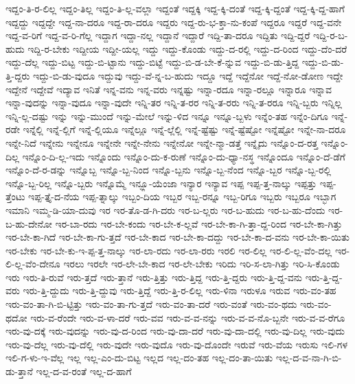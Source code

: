 {ಇದ್ದಂ-ತಿ-ರ-ಲಿಲ್ಲ
ಇದ್ದಂ-ತಿಲ್ಲ
ಇದ್ದಂ-ತಿ-ಲ್ಲ-ವಲ್ಲಾ
ಇದ್ದಂತೆ
ಇದ್ದಕ್ಕಿ
ಇದ್ದ-ಕ್ಕಿ-ದಂತೆ
ಇದ್ದ-ಕ್ಕಿ-ದ್ದಂತೆ
ಇದ್ದ-ಕ್ಕಿ-ದ್ದ-ಹಾಗೆ
ಇದ್ದದ್ದು
ಇದ್ದದ್ದೇ
ಇದ್ದ-ನಾ-ದರೂ
ಇದ್ದ-ರಾ-ದರೂ
ಇದ್ದರು
ಇದ್ದ-ರು-ಭ-ಕ್ತಾ-ನು-ಕಂಪೆ
ಇದ್ದರೂ
ಇದ್ದರೆ
ಇದ್ದ-ವನೇ
ಇದ್ದ-ವ-ರಿಗೆ
ಇದ್ದ-ವ-ರಿ-ಗೆಲ್ಲ
ಇದ್ದಾಗ
ಇದ್ದಾ-ನಲ್ಲ
ಇದ್ದಾನೆ
ಇದ್ದಾರೆ
ಇದ್ದಿ-ತಾ-ದರೂ
ಇದ್ದಿತು
ಇದ್ದಿ-ದ್ದರೆ
ಇದ್ದಿ-ರ-ಬ-ಹುದು
ಇದ್ದಿ-ರ-ಬೇಕು
ಇದ್ದೀಯ
ಇದ್ದೀ-ಯಲ್ಲ
ಇದ್ದು
ಇದ್ದು-ಕೊಂಡು
ಇದ್ದು-ದ-ರಲ್ಲಿ
ಇದ್ದು-ದ-ರಿಂದ
ಇದ್ದು-ದೆಂ-ದರೆ
ಇದ್ದು-ದೆಲ್ಲ
ಇದ್ದು-ಬಿಟ್ಟ
ಇದ್ದು-ಬಿ-ಟ್ಟಾನು
ಇದ್ದು-ಬಿಟ್ಟೆ
ಇದ್ದು-ಬಿ-ಡ-ಬೇ-ಕೆ-ನ್ನುವ
ಇದ್ದು-ಬಿ-ಡು-ತ್ತಿದ್ದ
ಇದ್ದು-ಬಿ-ಡು-ತ್ತಿ-ದ್ದರು
ಇದ್ದು-ಬಿ-ಡು-ವುದೂ
ಇದ್ದುವು
ಇದ್ದು-ವೆ-ನ್ನ-ಬ-ಹುದು
ಇದ್ದೂ
ಇದ್ದೆ
ಇದ್ದೆನೋ
ಇದ್ದೆ-ನೋ-ಡೋಣ
ಇದ್ದೇ
ಇದ್ದೇನೆ
ಇದ್ದೇವೆ
ಇದ್ಯಾವ
ಇನಿತೆ
ಇನ್ನ-ವನು
ಇನ್ನ-ವರು
ಇನ್ನಷ್ಟು
ಇನ್ನಾ-ರದೂ
ಇನ್ನಾ-ರಲ್ಲೂ
ಇನ್ನಾರೂ
ಇನ್ನಾವ
ಇನ್ನಾ-ವುದನ್ನು
ಇನ್ನಾ-ವುದೂ
ಇನ್ನಾ-ವುದೇ
ಇನ್ನಿ-ತರ
ಇನ್ನಿ-ತ-ರರ
ಇನ್ನಿ-ತ-ರರು
ಇನ್ನಿ-ತ-ರರೂ
ಇನ್ನಿ-ಬ್ಬರು
ಇನ್ನಿಲ್ಲ
ಇನ್ನಿ-ಲ್ಲ-ದಷ್ಟು
ಇನ್ನು
ಇನ್ನು-ಮುಂದೆ
ಇನ್ನು-ಮೇಲೆ
ಇನ್ನು-ಳಿದ
ಇನ್ನೂ
ಇನ್ನೂ-ಬ್ಬಳು
ಇನ್ನೆಂ-ತಹ
ಇನ್ನೆಂ-ದಿಗೂ
ಇನ್ನೆ-ರಡೇ
ಇನ್ನೆಲ್ಲಿ
ಇನ್ನೆ-ಲ್ಲಿಗೆ
ಇನ್ನೆ-ಲ್ಲಿಯೂ
ಇನ್ನೆಲ್ಲೂ
ಇನ್ನೆ-ಲ್ಲೆಲ್ಲಿ
ಇನ್ನೆ-ಷ್ಟೆಷ್ಟು
ಇನ್ನೆ-ಷ್ಟೆಷ್ಟೋ
ಇನ್ನೆಷ್ಟೋ
ಇನ್ನೇ-ನಾ-ದರೂ
ಇನ್ನೇ-ನಿದೆ
ಇನ್ನೇನು
ಇನ್ನೇನೂ
ಇನ್ನೇನೇ
ಇನ್ನೇ-ನೇನು
ಇನ್ನೇನೋ
ಇನ್ನೇ-ನ್ಮಾ-ಡತ್ತೆ
ಇನ್ನೈದು
ಇನ್ನೊಂ-ದ-ರತ್ತ
ಇನ್ನೊಂ-ದಿಲ್ಲ
ಇನ್ನೊಂ-ದಿ-ಲ್ಲ-ಇದು
ಇನ್ನೊಂದು
ಇನ್ನೊಂ-ದು-ಕ-ರುಣೆ
ಇನ್ನೊಂ-ದು-ಧ್ಯಾ-ನಸ್ಥ
ಇನ್ನೊಂದೂ
ಇನ್ನೊಂ-ದೆ-ಡೆಗೆ
ಇನ್ನೊಂ-ದೆ-ರ-ಡನ್ನು
ಇನ್ನೊಬ್ಬ
ಇನ್ನೊ-ಬ್ಬ-ನಿಂದ
ಇನ್ನೊ-ಬ್ಬನು
ಇನ್ನೊ-ಬ್ಬ-ನೆಂದ
ಇನ್ನೊ-ಬ್ಬರ
ಇನ್ನೊ-ಬ್ಬ-ರಲ್ಲಿ
ಇನ್ನೊ-ಬ್ಬ-ರಿಲ್ಲ
ಇನ್ನೊ-ಬ್ಬರು
ಇನ್ನೊಮ್ಮೆ
ಇನ್ಫ್ಲೂ-ಯೆಂಜಾ
ಇನ್ಯಾರ
ಇನ್ಯಾವ
ಇಪ್ಪ
ಇಪ್ಪ-ತ್ತ-ನಾಲ್ಕು
ಇಪ್ಪತ್ತು
ಇಪ್ಪ-ತ್ತೆಂಟು
ಇಪ್ಪ-ತ್ತೈ-ದ-ನೆಯ
ಇಪ್ಪ-ತ್ನಾಲ್ಕು
ಇಬ್ಬಂ-ದಿಯ
ಇಬ್ಬರ
ಇಬ್ಬ-ರನ್ನೂ
ಇಬ್ಬ-ರಿಗೂ
ಇಬ್ಬರು
ಇಬ್ಬರೂ
ಇಬ್ಭಾಗ
ಇಮಾನಿ
ಇಮ್ಮ-ಡಿ-ಯಾ-ದುವು
ಇರ
ಇರ-ತೊ-ಡ-ಗಿ-ದರು
ಇರ-ಬ-ಲ್ಲರು
ಇರ-ಬ-ಹುದು
ಇರ-ಬ-ಹು-ದೆಂದು
ಇರ-ಬ-ಹು-ದೇನೋ
ಇರ-ಬಾ-ರದು
ಇರ-ಬೇ-ಕಂದು
ಇರ-ಬೇ-ಕ-ಲ್ಲವೆ
ಇರ-ಬೇ-ಕಾ-ಗಿ-ತ್ತಾ-ದ್ದ-ರಿಂದ
ಇರ-ಬೇ-ಕಾ-ಗಿತ್ತು
ಇರ-ಬೇ-ಕಾ-ಗಿದೆ
ಇರ-ಬೇ-ಕಾ-ಗು-ತ್ತದೆ
ಇರ-ಬೇ-ಕಾದ
ಇರ-ಬೇ-ಕಾ-ದದ್ದು
ಇರ-ಬೇ-ಕಾ-ದ-ವನು
ಇರ-ಬೇ-ಕಾ-ಯಿತು
ಇರ-ಬೇಕು
ಇರ-ಬೇ-ಕು-ಇ-ಪ್ಪ-ತ್ತ-ನಾಲ್ಕು
ಇರ-ಲಾ-ರದು
ಇರ-ಲಾ-ರರು
ಇರಲಿ
ಇರ-ಲಿಲ್ಲ
ಇರ-ಲಿ-ಲ್ಲ-ವೆಂ-ದಲ್ಲ
ಇರ-ಲಿ-ಲ್ಲ-ವೆಂ-ದೇನೂ
ಇರಲು
ಇರಲೇ
ಇರ-ಲೇ-ಬೇ-ಕಾದ
ಇರ-ಲೇ-ಬೇಕು
ಇರಿದು
ಇರಿ-ಸ-ಲಾ-ಗಿತ್ತು
ಇರಿ-ಸಿ-ಕೊಂಡು
ಇರು
ಇರು-ತಿ-ರುವೆ
ಇರು-ತ್ತದೆ
ಇರು-ತ್ತಾನೆ
ಇರು-ತ್ತಿತ್ತು
ಇರು-ತ್ತಿದ್ದ
ಇರು-ತ್ತಿ-ದ್ದರು
ಇರು-ತ್ತಿ-ದ್ದ-ವನು
ಇರು-ತ್ತಿ-ದ್ದ-ವರು
ಇರು-ತ್ತಿ-ದ್ದುದು
ಇರು-ತ್ತಿ-ದ್ದುವು
ಇರು-ತ್ತಿದ್ದೆ
ಇರು-ತ್ತಿ-ರ-ಲಿಲ್ಲ
ಇರು-ಳಿನಾ
ಇರುಳೂ
ಇರುವ
ಇರು-ವಂ-ತಹ
ಇರು-ವಂ-ತಾ-ಗಿ-ಬಿ-ಟ್ಟಿತ್ತು
ಇರು-ವಂ-ತಾ-ಗು-ತ್ತದೆ
ಇರು-ವಂ-ತಾ-ದರೆ
ಇರು-ವಂತೆ
ಇರು-ವಂ-ಥದು
ಇರು-ವಂ-ಥದೋ
ಇರು-ವ-ರೆಂದೇ
ಇರು-ವ-ಳಾ-ದರೆ
ಇರು-ವವ
ಇರು-ವ-ವ-ನನ್ನು
ಇರು-ವ-ವ-ನೊ-ಬ್ಬನೇ
ಇರು-ವ-ವ-ರೆಗೂ
ಇರು-ವು-ದಕ್ಕೆ
ಇರು-ವುದನ್ನು
ಇರು-ವು-ದ-ರಿಂದ
ಇರು-ವು-ದಾ-ದರೆ
ಇರು-ವು-ದಾ-ದಲ್ಲಿ
ಇರು-ವು-ದಿಲ್ಲ
ಇರು-ವುದು
ಇರು-ವು-ದೆಲ್ಲ
ಇರು-ವು-ದೆಲ್ಲಿ
ಇರು-ವುದೇ
ಇರು-ವುದೊ
ಇರು-ವು-ದೊಂದೇ
ಇರುವೆ
ಇರು-ವೆಯ
ಇರುಸು
ಇಲಿ-ಗಳ
ಇಲಿ-ಗ-ಳು-ಇ-ವೆಲ್ಲ
ಇಲ್ಲ
ಇಲ್ಲ-ಎಂ-ದು-ಬಿಟ್ಟ
ಇಲ್ಲದ
ಇಲ್ಲ-ದಂ-ತಹ
ಇಲ್ಲ-ದಂ-ತಾ-ಯಿತು
ಇಲ್ಲ-ದ-ವ-ನಾ-ಗಿ-ಬಿ-ಡು-ತ್ತಾನೆ
ಇಲ್ಲ-ದ-ವ-ರಂತೆ
ಇಲ್ಲ-ದ-ಹಾಗೆ
}
